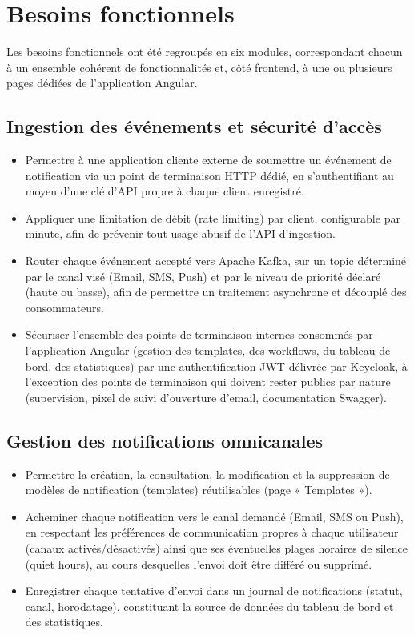 \documentclass[12pt,a4paper]{report}
\begin{document}
\section{Besoins fonctionnels}

Les besoins fonctionnels ont été regroupés en six modules, correspondant chacun à un ensemble cohérent de fonctionnalités et, côté frontend, à une ou plusieurs pages dédiées de l'application Angular.

\subsection{Ingestion des événements et sécurité d'accès}

\begin{itemize}
  \item Permettre à une application cliente externe de soumettre un événement de notification via un point de terminaison HTTP dédié, en s'authentifiant au moyen d'une clé d'API propre à chaque client enregistré.
  \item Appliquer une limitation de débit (rate limiting) par client, configurable par minute, afin de prévenir tout usage abusif de l'API d'ingestion.
  \item Router chaque événement accepté vers Apache Kafka, sur un topic déterminé par le canal visé (Email, SMS, Push) et par le niveau de priorité déclaré (haute ou basse), afin de permettre un traitement asynchrone et découplé des consommateurs.
  \item Sécuriser l'ensemble des points de terminaison internes consommés par l'application Angular (gestion des templates, des workflows, du tableau de bord, des statistiques) par une authentification JWT délivrée par Keycloak, à l'exception des points de terminaison qui doivent rester publics par nature (supervision, pixel de suivi d'ouverture d'email, documentation Swagger).
\end{itemize}

\subsection{Gestion des notifications omnicanales}

\begin{itemize}
  \item Permettre la création, la consultation, la modification et la suppression de modèles de notification (templates) réutilisables (page « Templates »).
  \item Acheminer chaque notification vers le canal demandé (Email, SMS ou Push), en respectant les préférences de communication propres à chaque utilisateur (canaux activés/désactivés) ainsi que ses éventuelles plages horaires de silence (quiet hours), au cours desquelles l'envoi doit être différé ou supprimé.
  \item Enregistrer chaque tentative d'envoi dans un journal de notifications (statut, canal, horodatage), constituant la source de données du tableau de bord et des statistiques.
\end{itemize}
\end{document}
